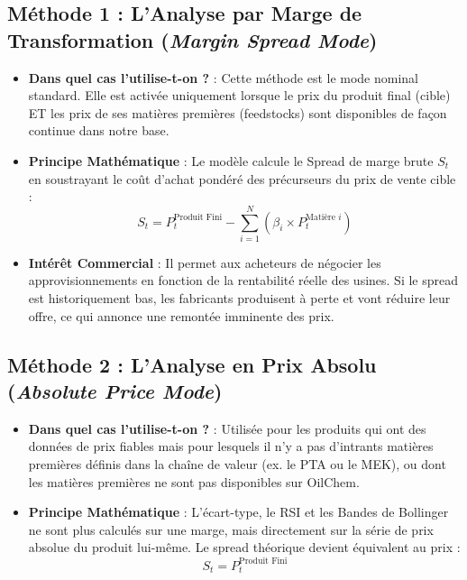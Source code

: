 \documentclass[12pt,a4paper]{article}
\begin{document}
\subsection{Méthode 1 : L'Analyse par Marge de Transformation (\textit{Margin Spread Mode})}
\begin{itemize}
    \item \textbf{Dans quel cas l'utilise-t-on ?} : Cette méthode est le mode nominal standard. Elle est activée uniquement lorsque le prix du produit final (cible) ET les prix de ses matières premières (feedstocks) sont disponibles de façon continue dans notre base.
    \item \textbf{Principe Mathématique} : Le modèle calcule le Spread de marge brute $S_t$ en soustrayant le coût d'achat pondéré des précurseurs du prix de vente cible :
    \begin{equation}
    S_t = P^{\text{Produit Fini}}_t - \sum_{i=1}^{N} \left( \beta_i \times P^{\text{Matière } i}_t \right)
    \end{equation}
    \item \textbf{Intérêt Commercial} : Il permet aux acheteurs de négocier les approvisionnements en fonction de la rentabilité réelle des usines. Si le spread est historiquement bas, les fabricants produisent à perte et vont réduire leur offre, ce qui annonce une remontée imminente des prix.
\end{itemize}

\subsection{Méthode 2 : L'Analyse en Prix Absolu (\textit{Absolute Price Mode})}
\begin{itemize}
    \item \textbf{Dans quel cas l'utilise-t-on ?} : Utilisée pour les produits qui ont des données de prix fiables mais pour lesquels il n'y a pas d'intrants matières premières définis dans la chaîne de valeur (ex. le PTA ou le MEK), ou dont les matières premières ne sont pas disponibles sur OilChem.
    \item \textbf{Principe Mathématique} : L'écart-type, le RSI et les Bandes de Bollinger ne sont plus calculés sur une marge, mais directement sur la série de prix absolue du produit lui-même. Le spread théorique devient équivalent au prix :
    \begin{equation}
    S_t = P^{\text{Produit Fini}}_t
    \end{equation}
\end{itemize}
\end{document}
